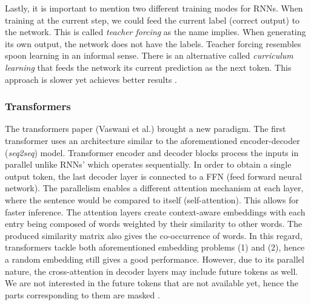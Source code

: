 \documentclass{article}
\begin{document}
Lastly, it is important to mention two different training modes for RNNs. When training at the current step, we could feed the current label (correct output) to the network. This is called \textit{teacher forcing} as the name implies. When generating its own output, the network does not have the labels. Teacher forcing resembles spoon learning in an informal sense. There is an alternative called \textit{curriculum learning} that feeds the network its current prediction as the next token. This approach is slower yet achieves better results \cite{lapan_deep_2020}.
\subsubsection{Transformers}
The transformers paper (Vaswani et al.) brought a new paradigm. The first transformer uses an architecture similar to the aforementioned encoder-decoder (\textit{seq2seq}) model. Transformer encoder and decoder blocks process the inputs in parallel unlike RNNs' which operates sequentially. In order to obtain a single output token, the last decoder layer is connected to a FFN (feed forward neural network). The parallelism enables a different attention mechanism at each layer, where the sentence would be compared to itself (self-attention). This allows for faster inference. The attention layers create context-aware embeddings with each entry being composed of words weighted by their similarity to other words. The produced similarity matrix also gives the co-occurrence of words. In this regard, transformers tackle both aforementioned embedding problems (1) and (2), hence a random embedding still gives a good performance. However, due to its parallel nature, the cross-attention in decoder layers may include future tokens as well. We are not interested in the future tokens that are not available yet, hence the parts corresponding to them are masked \cite{vaswani_attention_2023}. 
\end{document}
